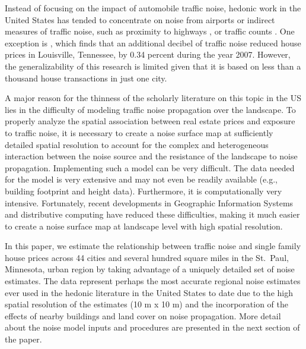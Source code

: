\documentclass{article}\usepackage{graphicx, color}
\begin{document}
Instead of focusing on the impact of automobile traffic noise, hedonic work in the United States has tended to concentrate on noise from airports \citep{Espey2000, McMillen2004, Cohen2008a} or indirect measures of traffic noise, such as proximity to highways \citep{Matthews2007, Chernobai2009, Li2012}, or traffic counts \citep{HughesJr.1992, Larsen2012}. One exception is \citet{Cheng2008}, which finds that an additional decibel of traffic noise reduced house prices in Louisville, Tennessee, by 0.34 percent during the year 2007. However, the generalizability of this research is limited given that it is based on less than a thousand house transactions in just one city. 

A major reason for the thinness of the scholarly literature on this topic in the US lies in the difficulty of modeling traffic noise propagation over the landscape. To properly analyze the spatial association between real estate prices and exposure to traffic noise, it is necessary to create a noise surface map at sufficiently detailed spatial resolution to account for the complex and heterogeneous interaction between the noise source and the resistance of the landscape to noise propagation.  Implementing such a model can be very difficult.  The data needed for the model is very extensive and may not even be readily available (e.g., building footprint and height data).  Furthermore, it is computationally very intensive. Fortunately, recent developments in Geographic Information Systems and distributive computing have reduced these difficulties, making it much easier to create a noise surface map at landscape level with high spatial resolution.  

In this paper, we estimate the relationship between traffic noise and single family house prices across 44 cities and several hundred square miles in the St.\ Paul, Minnesota, urban region by taking advantage of a uniquely detailed set of noise estimates. The data represent perhaps the most accurate regional noise estimates ever used in the hedonic literature in the United States to date due to the high spatial resolution of the estimates (10 m x 10 m) and the incorporation of the effects of nearby buildings and land cover on noise propagation. More detail about the noise model inputs and procedures are presented in the next section of the paper. 
 
\end{document}
